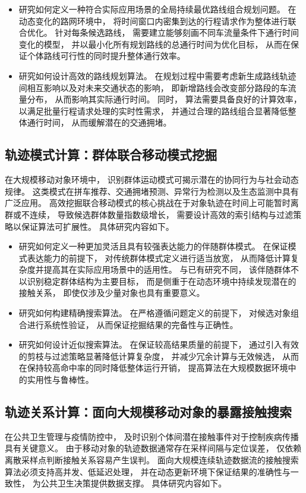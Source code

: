 \begin{itemize}
    \item 研究如何定义一种符合实际应用场景的全局持续最优路线组合规划问题。 在动态变化的路网环境中， 将时间窗口内密集到达的行程请求作为整体进行联合优化。 针对每条候选路线， 需要建立能够刻画不同车流量条件下通行时间变化的模型， 并以最小化所有规划路线的总通行时间为优化目标， 从而在保证个体路线可行性的同时提升整体通行效率。

    \item 研究如何设计高效的路线规划算法。 在规划过程中需要考虑新生成路线轨迹间相互影响以及对未来交通状态的影响， 即新增路线会改变部分路段的车流量分布， 从而影响其实际通行时间。 同时， 算法需要具备良好的计算效率， 以满足批量行程请求处理的实时性需求， 并通过合理的路线组合显著降低整体通行时间， 从而缓解潜在的交通拥堵。
\end{itemize}


\subsection{轨迹模式计算：群体联合移动模式挖掘}
在大规模移动对象环境中， 识别群体运动模式可揭示潜在的协同行为与社会动态规律。 这类模式在拼车推荐、交通拥堵预测、异常行为检测以及生态监测中具有广泛应用。 高效挖掘联合移动模式的核心挑战在于对象轨迹在时间上可能暂时离群或不连续， 导致候选群体数量指数级增长， 需要设计高效的索引结构与过滤策略以保证算法可扩展性。 具体研究内容如下。

\begin{itemize}
    \item 研究如何定义一种更加灵活且具有较强表达能力的伴随群体模式。 在保证模式表达能力的前提下， 对传统群体模式定义进行适当放宽， 从而降低计算复杂度并提高其在实际应用场景中的适用性。 与已有研究不同， 该伴随群体不以识别稳定群体结构为主要目标， 而是侧重于在动态环境中持续发现潜在的接触关系， 即使仅涉及少量对象也具有重要意义。

    \item 研究如何构建精确搜索算法。 在严格遵循问题定义的前提下， 对候选对象组合进行系统性验证， 从而保证挖掘结果的完备性与正确性。

    \item 研究如何设计近似搜索算法。 在保证较高结果质量的前提下， 通过引入有效的剪枝与过滤策略显著降低计算复杂度， 并减少冗余计算与无效候选， 从而在保持较高命中率的同时降低整体运行开销， 提高算法在大规模数据环境中的实用性与鲁棒性。
\end{itemize}

\subsection{轨迹关系计算：面向大规模移动对象的暴露接触搜索}
在公共卫生管理与疫情防控中， 及时识别个体间潜在接触事件对于控制疾病传播具有关键意义。 由于移动对象的轨迹数据通常存在采样间隔与定位误差， 仅依赖离散采样点判断接触关系容易产生误判。 面向大规模连续轨迹数据流的接触搜索算法必须支持高并发、低延迟处理， 并在动态更新环境下保证结果的准确性与一致性， 为公共卫生决策提供数据支撑。 具体研究内容如下。


